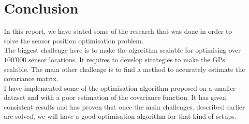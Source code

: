 \chapter{Conclusion}



In this report, we have stated some of the research that was done in order to solve the sensor position optimisation problem. \\ 

The biggest challenge here is to make the algorithm scalable for optimising over $100'000$ sensor locations. It requires to develop strategies to make the GPs scalable. The main other challenge is to find a method to accurately estimate the covariance matrix. \\

I have implemented some of the optimisation algorithm proposed on a smaller dataset and with a poor estimation of the covariance function. It has given consistent results and has proven that once the main challenges, described earlier are solved, we will have a good optimisation algorithm for that kind of setups. 